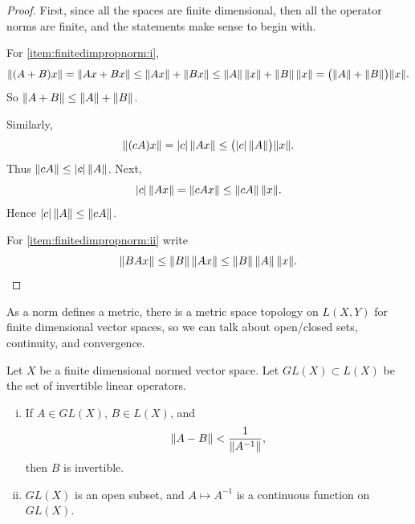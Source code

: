 \begin{proof}
First, since all the spaces are finite dimensional, then all the operator
norms are finite, and the statements make sense to begin with.

For \ref{item:finitedimpropnorm:i},
\begin{equation*}
\lVert {(A+B)x} \rVert =
\lVert {Ax+Bx} \rVert \leq
\lVert {Ax} \rVert+\lVert {Bx} \rVert \leq
\lVert {A} \rVert \, \lVert {x} \rVert+\lVert {B} \rVert \,\lVert {x} \rVert =
\bigl(\lVert {A} \rVert+\lVert {B} \rVert\bigr) \lVert {x} \rVert .
\end{equation*}
So $\lVert {A+B} \rVert \leq \lVert {A} \rVert+\lVert {B} \rVert$.

Similarly,
\begin{equation*}
\lVert {(cA)x} \rVert =
\lvert {c} \rvert \, \lVert {Ax} \rVert \leq \bigl(\lvert {c} \rvert \,\lVert {A} \rVert\bigr) \lVert {x} \rVert .
\end{equation*}
Thus $\lVert {cA} \rVert \leq \lvert {c} \rvert \, \lVert {A} \rVert$.  Next,
\begin{equation*}
\lvert {c} \rvert \,  \lVert {Ax} \rVert
=
\lVert {cAx} \rVert \leq \lVert {cA} \rVert \, \lVert {x} \rVert .
\end{equation*}
Hence $\lvert {c} \rvert \, \lVert {A} \rVert \leq \lVert {cA} \rVert$.


For \ref{item:finitedimpropnorm:ii} write
\begin{equation*}
\lVert {BAx} \rVert \leq \lVert {B} \rVert \, \lVert {Ax} \rVert \leq \lVert {B} \rVert \, \lVert {A} \rVert \, \lVert {x} \rVert .
\qedhere
\end{equation*}
\end{proof}

As a norm defines a metric,
there is
a metric space topology on $L(X,Y)$ for finite dimensional vector spaces,
so we can talk
about open/closed sets, continuity, and convergence.

\begin{prop} \label{prop:finitedimpropinv}
Let $X$ be a finite dimensional normed vector space.
Let $GL(X) \subset L(X)$ be the set of invertible linear operators.
\begin{enumerate}[(i)]
\item \label{finitedimpropinv:i}
If $A \in GL(X)$, $B \in L(X)$, and
\begin{equation} \label{eqcontineq}
\lVert {A-B} \rVert <  \frac{1}{\lVert {A^{-1}} \rVert},
\end{equation}
then $B$ is invertible.
\item \label{finitedimpropinv:ii}
$GL(X)$ is an open subset, and $A \mapsto A^{-1}$ is a continuous
function on $GL(X)$.
\end{enumerate}
\end{prop}

